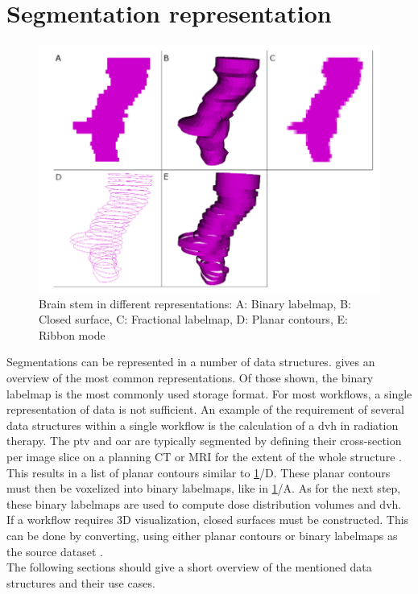 \section{Segmentation representation}\label{s:b-seg-rep}
\begin{figure}[h]
	\centerline{
		\includegraphics[scale=0.5]{images/segRep.png}}
	\caption{Brain stem in different representations: A: Binary labelmap, B: Closed surface, C: Fractional labelmap, D: Planar contours, E: Ribbon mode \cite{pinterPolymorphSegmentationRepresentation2019}}\label{fig:segRep}
\end{figure}
\noindent
Segmentations can be represented in a number of data structures.
 gives an overview of the most common representations.
Of those shown, the binary labelmap is the most commonly used storage format.
For most workflows, a single representation of data is not sufficient.
An example of the requirement of several data structures within a single workflow is the calculation of a \acrfull{dvh} in radiation therapy.
The \acrfull{ptv} and \acrfull{oar} are typically segmented by defining their cross-section per
image slice on a planning CT or MRI for the extent of the whole structure \cite{burnetDefiningTumourTarget2004}.
This results in a list of planar contours similar to \cref{fig:segRep}/D.
These planar contours must then be voxelized into binary labelmaps, like in \cref{fig:segRep}/A.
As for the next step, these binary labelmaps are used to compute dose distribution volumes and \acrlong{dvh}.
If a workflow requires 3D visualization, closed surfaces must be constructed.
This can be done by converting, using either planar contours or binary labelmaps as the source dataset \cite{pinterPolymorphSegmentationRepresentation2019}.\\
The following sections should give a short overview of the mentioned data structures and their use cases.

